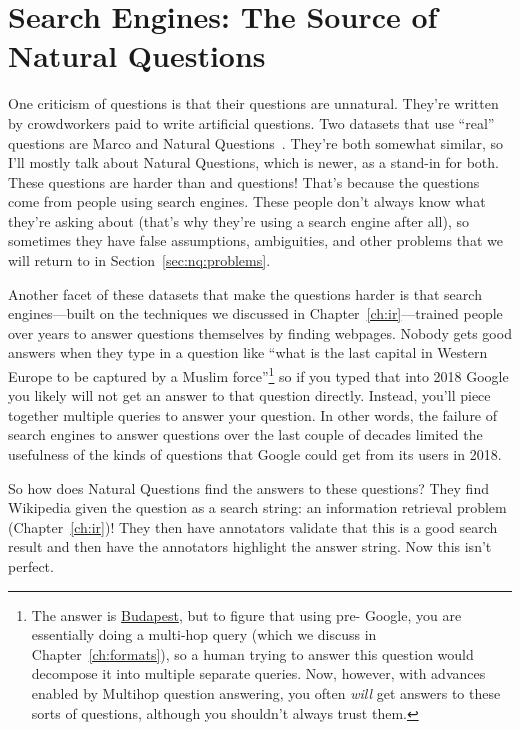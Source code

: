 \section{Search Engines: The Source of Natural Questions}
\label{sec:datasets:nq}

One criticism of \squad{} questions is that their questions are
unnatural.  They’re written by crowdworkers paid to write artificial
questions.  Two datasets that use ``real'' questions are  Marco
and Natural Questions~\citep{Nguyen2016MSMA,kwiatkowski-19}.
%
They’re both somewhat similar, so I’ll mostly talk about Natural
Questions, which is newer, as a stand-in for both.
%
These questions are harder than \squad{} and  questions!  That’s
because the questions come from people using search engines.
%
These people don’t always know what they’re asking about (that’s why
they’re using a search engine after all), so sometimes they have false
assumptions, ambiguities, and other problems that we will return to in
Section~\ref{sec:nq:problems}.

Another facet of these datasets that make the questions harder is that
search engines---built on the techniques we discussed in
Chapter~\ref{ch:ir}---trained people over years to answer questions
themselves by finding webpages.  Nobody gets good answers when they
type in a question like ``what is the last capital in Western Europe
to be captured by a Muslim force''\footnote{The answer is
  \underline{Budapest}, but to figure that using pre- Google, you are essentially
  doing a multi-hop query (which we discuss in
  Chapter~\ref{ch:formats}), so a human trying to answer this question
  would decompose it into multiple separate queries.
%
  Now, however, with advances enabled by Multihop question answering,
  you often \emph{will} get answers to these sorts of questions,
  although you shouldn't always trust them. } so if you typed that
into 2018 Google you likely will not get an answer to that question
directly.  Instead, you’ll piece together multiple queries to answer
your question.
%
In other words, the failure of search engines to answer questions over
the last couple of decades limited the usefulness of the kinds of
questions that Google could get from its users in 2018.

So how does Natural Questions find the answers to these questions?
%
They find Wikipedia given the question as a search string: an
information retrieval problem (Chapter~\ref{ch:ir})!
%
They then have annotators validate that this is a good search result
and then have the annotators highlight the answer string.  Now this
isn’t perfect.

